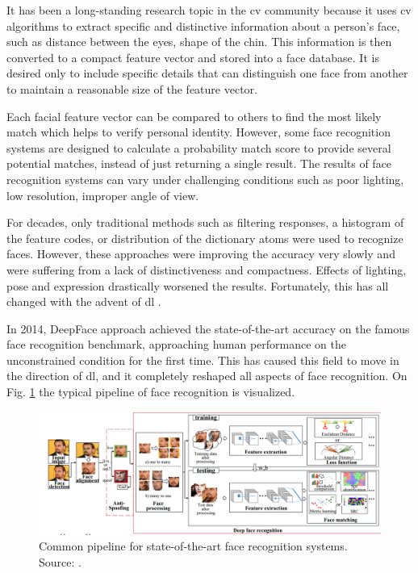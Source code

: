         It has been a long-standing research topic in the \gls{cv} community because it uses \gls{cv} algorithms to extract specific and distinctive information about a person's face, such as distance between the eyes, shape of the chin. This information is then converted to a compact feature vector and stored into a face database. It is desired only to include specific details that can distinguish one face from another to maintain a reasonable size of the feature vector. 
        
        Each facial feature vector can be compared to others to find the most likely match which helps to verify personal identity. However, some face recognition systems are designed to calculate a probability match score to provide several potential matches, instead of just returning a single result. The results of face recognition systems can vary under challenging conditions such as poor lighting, low resolution, improper angle of view.
        
        For decades, only traditional methods such as filtering responses, a histogram of the feature codes, or distribution of the dictionary atoms were used to recognize faces. However, these approaches were improving the accuracy very slowly and were suffering from a lack of distinctiveness and compactness. Effects of lighting, pose and expression drastically worsened the results. Fortunately, this has all changed with the advent of \gls{dl} \cite{goodfellow2016deep}. 
        
        In 2014, DeepFace \cite{taigman2014deepface} approach achieved the state-of-the-art accuracy on the famous face recognition benchmark, approaching human performance on the unconstrained condition for the first time. This has caused this field to move in the direction of \gls{dl}, and it completely reshaped all aspects of face recognition. On Fig. \ref{fig:deep face recognition} the typical pipeline of face recognition is visualized.
        
        \begin{figure}[ht]
            \centering
            \includegraphics[width=1\textwidth]{resources/deep_face_recognition.png}
            \caption{Common pipeline for state-of-the-art face recognition systems. Source: \cite{wang2018deep}.}
            \label{fig:deep face recognition}
        \end{figure}

